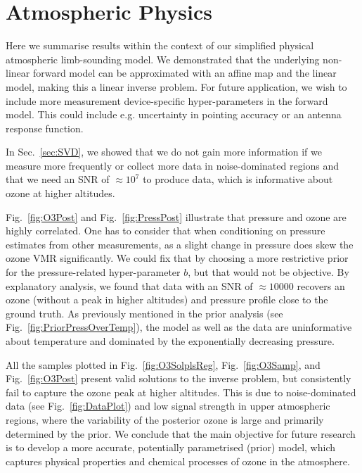 \section{Atmospheric Physics}
Here we summarise results within the context of our simplified physical atmospheric limb-sounding model.
We demonstrated that the underlying non-linear forward model can be approximated with an affine map and the linear model, making this a linear inverse problem.
For future application, we wish to include more measurement device-specific hyper-parameters in the forward model.
This could include e.g. uncertainty in pointing accuracy or an antenna response function.

In Sec.~\ref{sec:SVD}, we showed that we do not gain more information if we measure more frequently or collect more data in noise-dominated regions and that we need an SNR of $\approx10^7$ to produce data, which is informative about ozone at higher altitudes.

Fig.~\ref{fig:O3Post} and Fig.~\ref{fig:PressPost} illustrate that pressure and ozone are highly correlated.
One has to consider that when conditioning on pressure estimates from other measurements, as a slight change in pressure does skew the ozone VMR significantly.
We could fix that by choosing a more restrictive prior for the pressure-related hyper-parameter $b$, but that would not be objective.
By explanatory analysis, we found that data with an SNR of $\approx 10000$ recovers an ozone (without a peak in higher altitudes) and pressure profile close to the ground truth.
As previously mentioned in the prior analysis (see Fig.~\ref{fig:PriorPressOverTemp}), the model as well as the data are uninformative about temperature and dominated by the exponentially decreasing pressure.

All the samples plotted in Fig.~\ref{fig:O3SolplsReg}, Fig.~\ref{fig:O3Samp}, and Fig.~\ref{fig:O3Post} present valid solutions to the inverse problem, but consistently fail to capture the ozone peak at higher altitudes.
This is due to noise-dominated data (see Fig.~\ref{fig:DataPlot}) and low signal strength in upper atmospheric regions, where the variability of the posterior ozone is large and primarily determined by the prior.
We conclude that the main objective for future research is to develop a more accurate, potentially parametrised (prior) model, which captures physical properties and chemical processes of ozone in the atmosphere.




